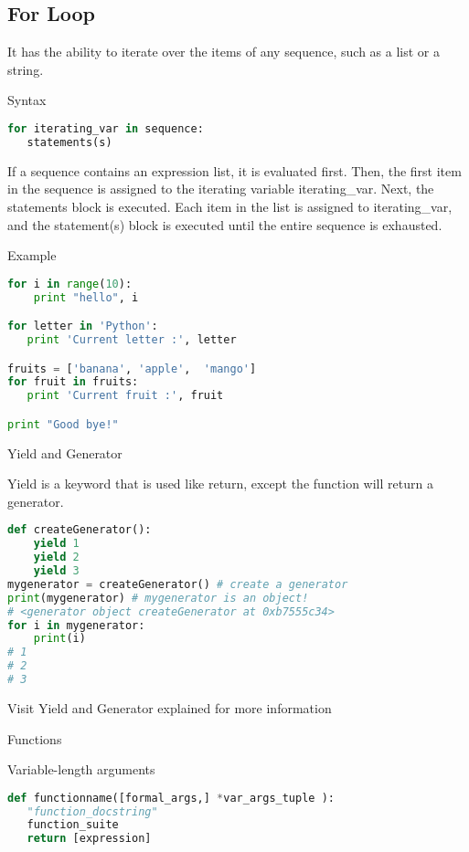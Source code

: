 \subsection{For Loop}

It has the ability to iterate over the items of any sequence, such as a list or a string.

Syntax

\begin{lstlisting}[language=Python]
for iterating_var in sequence:
   statements(s)
\end{lstlisting}

If a sequence contains an expression list, it is evaluated first. Then, the first item in the sequence is assigned to the iterating variable iterating_var. Next, the statements block is executed. Each item in the list is assigned to iterating_var, and the statement(s) block is executed until the entire sequence is exhausted.

Example

\begin{lstlisting}[language=Python]
for i in range(10):
    print "hello", i

for letter in 'Python':
   print 'Current letter :', letter

fruits = ['banana', 'apple',  'mango']
for fruit in fruits:
   print 'Current fruit :', fruit

print "Good bye!"
\end{lstlisting}

Yield and Generator

Yield is a keyword that is used like return, except the function will return a generator.

\begin{lstlisting}[language=Python]
def createGenerator():
    yield 1
    yield 2
    yield 3
mygenerator = createGenerator() # create a generator
print(mygenerator) # mygenerator is an object!
# <generator object createGenerator at 0xb7555c34>
for i in mygenerator:
    print(i)
# 1
# 2
# 3
\end{lstlisting}


Visit Yield and Generator explained for more information

Functions

Variable-length arguments

\begin{lstlisting}[language=Python]
def functionname([formal_args,] *var_args_tuple ):
   "function_docstring"
   function_suite
   return [expression]
\end{lstlisting}

